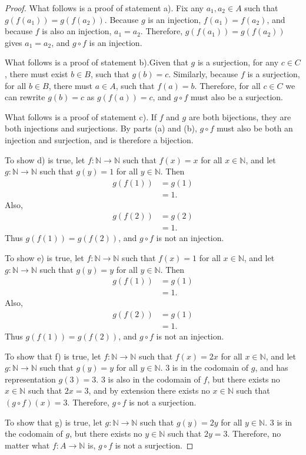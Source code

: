 \documentclass{amsart}
\newcommand{\N}{\mathbb N}
\newcommand{\1}{\mathds{1}}
\def \N {{\mathbb {N}}}
\numberwithin{equation}{section}
\numberwithin{theorem}{section}
\begin{document}
\begin{proof}
	What follows is a proof of statement a). Fix any $a_1,a_2\in A$ such that $g(f(a_1)) = g(f(a_2))$. Because $g$ is an injection, $f(a_1) = f(a_2)$, and because $f$ is also an injection, $a_1 = a_2$. Therefore, $g(f(a_1)) = g(f(a_2))$ gives $a_1 = a_2$, and $g\circ f$ is an injection.

	What follows is a proof of statement b).Given that $g$ is a surjection, for any $c\in C$, there must exist $b\in B$, such that $g(b) = c$. Similarly, because $f$ is a surjection, for all $b\in B$, there must $a\in A$, such that $f(a) = b$. Therefore, for all $c\in C$ we can rewrite $g(b) = c$ as $g(f(a)) = c$, and $g\circ f$ must also be a surjection.

	What follows is a proof of statement c). If $f$ and $g$ are both bijections, they are both injections and surjections. By parts (a) and (b), $g\circ f$ must also be both an injection and surjection, and is therefore a bijection.

	To show d) is true, let $f:\N\to\N$ such that $f(x)=x$ for all $x\in\N$, and let $g:\N\to\N$ such that $g(y)=1$ for all $y\in\N$. Then 
	\[
	\begin{split}
		g(f(1)) &= g(1)
		\\
		&= 1.
	\end{split}		
	\]
	Also,  
	\[\begin{split}
		g(f(2)) &= g(2)\\
		&= 1.
	\end{split}\]
	Thus $g(f(1))=g(f(2))$, and $g\circ f$ is not an injection.

	To show e) is true, let $f:\N\to\N$ such that $f(x)=1$ for all $x\in\N$, and let $g:\N\to\N$ such that $g(y)=y$ for all $y\in\N$. Then
	\[
	\begin{split}
		g(f(1)) &= g(1)
		\\
		&= 1.
	\end{split}		
	\]
	Also,  
	\[\begin{split}
		g(f(2)) &= g(1)\\
		&= 1.
	\end{split}\]
	Thus $g(f(1))=g(f(2))$, and $g\circ f$ is not an injection.

	To show that f) is true, let $f:\N\to\N$ such that $f(x)=2x$ for all $x\in\N$, and let $g:\N\to\N$ such that $g(y)=y$ for all $y\in\N$. $3$ is in the codomain of $g$, and has representation $g(3) = 3$. $3$ is also in the codomain of $f$, but there exists no $x\in\N$ such that $2x = 3$, and by extension there exists no $x\in\N$ such that $(g\circ f)(x) = 3$. Therefore, $g\circ f$ is not a surjection.

	To show that g) is true, let $g:\N\to\N$ such that $g(y)=2y$ for all $y\in\N$. $3$ is in the codomain of $g$, but there exists no $y\in\N$ such that $2y = 3$. Therefore, no matter what $f:A\to\N$ is, $g\circ f$ is not a surjection.
\end{proof}
\end{document}
